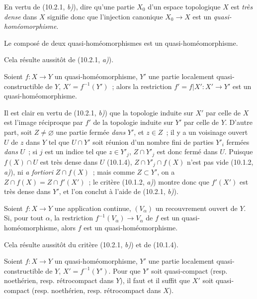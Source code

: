 En vertu de (10.2.1, \emph{b)}), dire qu'une partie $X_0$ d'un espace
topologique $X$ est \emph{très dense} dans $X$ signifie donc que l'injection
canonique $X_0\to X$ est un \emph{quasi-homéomorphisme}.

\begin{corollary}[10.2.3]
\label{IV.10.2.3-fr}
Le composé de deux quasi-homéomorphismes est un quasi-homéomorphisme.
\end{corollary}

Cela résulte aussitôt de (10.2.1, \emph{a)}).

\begin{corollary}[10.2.4]
\label{IV.10.2.4-fr}
Soient $f:X\to Y$ un quasi-homéomorphisme, $Y'$ une partie localement
quasi-constructible de $Y$, $X'=f^{-1}(Y')$~; alors la restriction
$f'=f|X':X'\to Y'$ est un quasi-homéomorphisme.
\end{corollary}

Il est clair en vertu de (10.2.1, \emph{b)}) que la topologie induite sur $X'$
par celle de $X$ est l'image réciproque par $f'$ de la topologie induite sur
$Y'$ par celle de $Y$. D'autre part,
soit $Z\neq\varnothing$ une partie fermée \emph{dans} $Y'$, et $z\in Z$~; il
y a un voisinage ouvert $U$ de $z$ dans $Y$ tel que $U\cap Y'$ soit réunion
d'un nombre fini de parties $Y'_i$ fermées \emph{dans} $U$~; si $j$ est un indice tel
que $z\in Y'_j$, $Z\cap Y'_j$ est donc fermé dans $U$. Puisque $f(X)\cap U$
est très dense dans $U$ (10.1.4), $Z\cap Y'_j\cap f(X)$ n'est pas vide
(10.1.2, \emph{a)}), ni \emph{a fortiori} $Z\cap f(X)$~; mais comme
$Z\subset Y'$, on a $Z\cap f(X)=Z\cap f'(X')$~; le critère
(10.1.2, \emph{a)}) montre donc que $f'(X')$ est très dense dans $Y'$, et
l'on conclut à l'aide de (10.2.1, \emph{b)}).

\begin{corollary}[10.2.5]
\label{IV.10.2.5-fr}
Soient $f:X\to Y$ une application continue, $(V_\alpha)$ un recouvrement
ouvert de $Y$. Si, pour tout $\alpha$, la restriction
$f^{-1}(V_\alpha)\to V_\alpha$ de $f$ est un quasi-homéomorphisme, alors $f$
est un quasi-homéomorphisme.
\end{corollary}

Cela résulte aussitôt du critère (10.2.1, \emph{b)}) et de (10.1.4).

\begin{corollary}[10.2.6]
\label{IV.10.2.6-fr}
Soient $f:X\to Y$ un quasi-homéomorphisme, $Y'$ une partie localement
quasi-constructible de $Y$, $X'=f^{-1}(Y')$. Pour que $Y'$ soit quasi-compact
(\textup{resp.} noethérien, \textup{resp.} rétrocompact dans $Y$), il faut et il suffit que $X'$
soit quasi-compact (\textup{resp.} noethérien, \textup{resp.} rétrocompact dans $X$).
\end{corollary}

